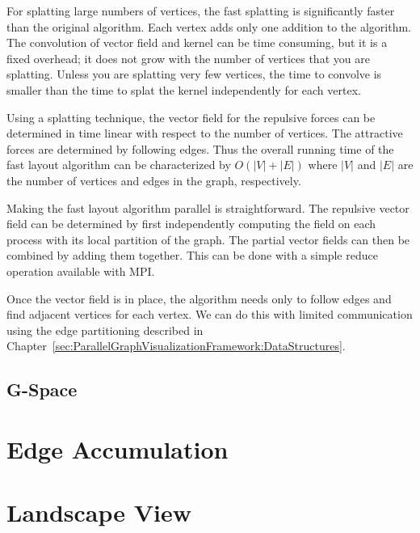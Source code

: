 \documentclass[pdf,12pt,report,strict]{SANDreport}
\begin{document}
For splatting large numbers of vertices, the fast splatting is
significantly faster than the original algorithm.  Each vertex adds only
one addition to the algorithm.  The convolution of vector field and kernel
can be time consuming, but it is a fixed overhead; it does not grow with
the number of vertices that you are splatting.  Unless you are splatting
very few vertices, the time to convolve is smaller than the time to splat
the kernel independently for each vertex.

Using a splatting technique, the vector field for the repulsive forces can
be determined in time linear with respect to the number of vertices.  The
attractive forces are determined by following edges.  Thus the overall
running time of the fast layout algorithm can be characterized by
$O(|V|+|E|)$ where $|V|$ and $|E|$ are the number of vertices and edges in
the graph, respectively.

Making the fast layout algorithm parallel is straightforward.  The
repulsive vector field can be determined by first independently computing
the field on each process with its local partition of the graph.  The
partial vector fields can then be combined by adding them together.  This
can be done with a simple reduce operation available with MPI.

Once the vector field is in place, the algorithm needs only to follow edges
and find adjacent vertices for each vertex.  We can do this with limited
communication using the edge partitioning
described in
Chapter~\ref{sec:ParallelGraphVisualizationFramework:DataStructures}.


\subsection{G-Space}
\label{sec:Layout:GSpace}




\section{Edge Accumulation}
\label{sec:EdgeAccumulation}

\section{Landscape View}
\label{sec:LandscapeView}
\end{document}

